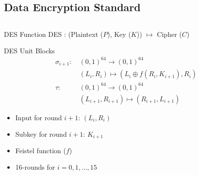 \documentclass[9pt]{beamer}
\begin{document}
\subsection{Data Encryption Standard}
\begin{frame}
\begin{columns}
\begin{column}{0.6\textwidth}
\begin{block}{DES Function}
DES : (Plaintext ($P$), Key ($K$)) $\mapsto$ Cipher ($C$)
\end{block}

\begin{block}{DES Unit Blocks}
\begin{align*}
\sigma_{i+1} : \: & (0,1)^{64} \rightarrow (0,1)^{64} \\
& (L_i, R_i) \mapsto (L_i \oplus f(R_i,K_{i+1}), R_i) \\
\tau : \: & (0,1)^{64} \rightarrow (0,1)^{64} \\
& (L_{i+1},R_{i+1}) \mapsto (R_{i+1},L_{i+1})
\end{align*}
\end{block}

\begin{itemize}
\item{Input for round $i+1$: $(L_i,R_i)$}
\item{Subkey for round $i+1$: $K_{i+1}$}
\item{Feistel function ($f$)}
\item{16-rounds for $i = 0, 1, ..., 15$}
\end{itemize}

\end{column}


\end{columns}
\end{frame}
\end{document}
